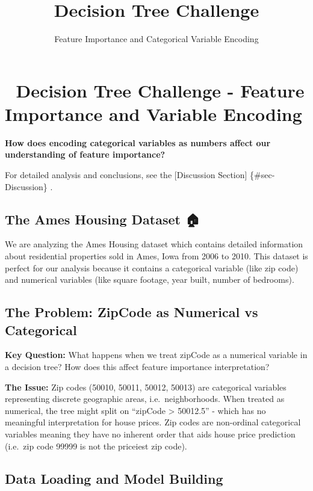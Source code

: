 \documentclass[
  letterpaper,
  DIV=11,
  numbers=noendperiod]{scrartcl}
\title{Decision Tree Challenge}
\subtitle{Feature Importance and Categorical Variable Encoding}
\author{}
\date{}
\begin{document}
\maketitle


\section{🌳 Decision Tree Challenge - Feature Importance and Variable
Encoding}\label{decision-tree-challenge---feature-importance-and-variable-encoding}

\textbf{How does encoding categorical variables as numbers affect our
understanding of feature importance?}

For detailed analysis and conclusions, see the {[}Discussion Section{]}
\{\#sec-Discussion\} .

\subsection{The Ames Housing Dataset 🏠}\label{the-ames-housing-dataset}

We are analyzing the Ames Housing dataset which contains detailed
information about residential properties sold in Ames, Iowa from 2006 to
2010. This dataset is perfect for our analysis because it contains a
categorical variable (like zip code) and numerical variables (like
square footage, year built, number of bedrooms).

\subsection{The Problem: ZipCode as Numerical vs
Categorical}\label{the-problem-zipcode-as-numerical-vs-categorical}

\textbf{Key Question:} What happens when we treat zipCode as a numerical
variable in a decision tree? How does this affect feature importance
interpretation?

\textbf{The Issue:} Zip codes (50010, 50011, 50012, 50013) are
categorical variables representing discrete geographic areas,
i.e.~neighborhoods. When treated as numerical, the tree might split on
``zipCode \textgreater{} 50012.5'' - which has no meaningful
interpretation for house prices. Zip codes are non-ordinal categorical
variables meaning they have no inherent order that aids house price
prediction (i.e.~zip code 99999 is not the priceiest zip code).

\subsection{Data Loading and Model
Building}\label{data-loading-and-model-building}
\end{document}
